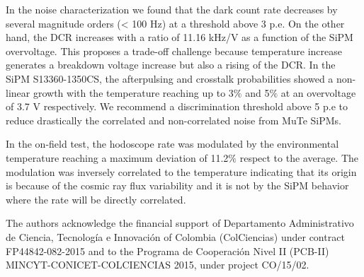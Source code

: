 \documentclass[a4paper,11pt]{article}
\begin{document}
In the noise characterization we found that the dark count rate decreases by several magnitude orders (< 100 Hz) at a threshold above 3 p.e. On the other hand, the DCR increases with a ratio of 11.16 kHz/V as a function of the SiPM overvoltage. This proposes a trade-off challenge because temperature increase generates a breakdown voltage increase but also a rising of the DCR. In the SiPM S13360-1350CS, the afterpulsing and crosstalk probabilities showed a non-linear growth with the temperature reaching up to 3$\%$ and 5$\%$ at an overvoltage of 3.7 V respectively. We recommend a discrimination threshold above 5 p.e to reduce drastically the correlated and non-correlated noise from MuTe SiPMs. 

In the on-field test, the hodoscope rate was modulated by the environmental temperature reaching a maximum deviation of 11.2$\%$ respect to the average. The modulation was inversely correlated to the temperature indicating that its origin is because of the cosmic ray flux variability and it is not by the SiPM behavior where the rate will be directly correlated.




\acknowledgments

The authors acknowledge the financial support of  Departamento Administrativo de Ciencia, Tecnolog\'ia e Innovaci\'on of Colombia (ColCiencias) under contract FP44842-082-2015 and to the Programa de Cooperaci\'on Nivel II (PCB-II) MINCYT-CONICET-COLCIENCIAS 2015, under project CO/15/02.








\end{document}
